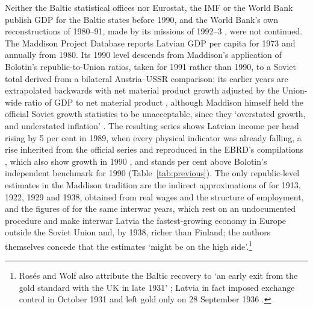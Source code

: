 Neither the Baltic statistical offices nor Eurostat, the IMF or the World Bank publish GDP for the Baltic states before 1990, and the World Bank's own reconstructions of 1980--91, made by its missions of 1992--3 \parencites[4]{wbtransitionlatv}[32--3]{worldtables1995}, were not continued. The Maddison Project Database reports Latvian GDP per capita for 1973 and annually from 1980. Its 1990 level descends from Maddison's application of Bolotin's republic-to-Union ratios, taken for 1991 rather than 1990, to a Soviet total derived from a bilateral Austria--USSR comparison; its earlier years are extrapolated backwards with net material product growth adjusted by the Union-wide ratio of GDP to net material product \parencite[181--2]{maddisonworldeconomy}, although Maddison himself held the official Soviet growth statistics to be unacceptable, since they `overstated growth, and understated inflation' \parencite[307--8]{Maddison1998b}. The resulting series shows Latvian income per head rising by 5 per cent in 1989, when every physical indicator was already falling, a rise inherited from the official series and reproduced in the EBRD's compilations \parencite[269]{kyn_1997_eastern}, which also show growth in 1990 \parencite[13]{kukk_2014_road}, and stands  per cent above Bolotin's independent benchmark for 1990 (Table~\ref{tab:previous}). The only republic-level estimates in the Maddison tradition are the indirect approximations of \textcite{norkusmark2021} for 1913, 1922, 1929 and 1938, obtained from real wages and the structure of employment, and the figures of \textcite[187--90]{roseswolf2010} for the same interwar years, which rest on an undocumented procedure and make interwar Latvia the fastest-growing economy in Europe outside the Soviet Union and, by 1938, richer than Finland; the authors themselves concede that the estimates `might be on the high side'.\footnote{Rosés and Wolf also attribute the Baltic recovery to `an early exit from the gold standard with the UK in late 1931' \parencite[189]{roseswolf2010}; Latvia in fact imposed exchange control in October 1931 and left gold only on 28 September 1936 \parencites[74]{bernankegd01}[146]{richter_2026_economic}.}

